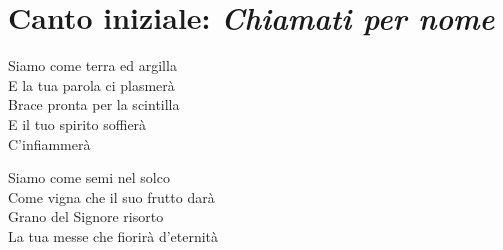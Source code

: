 
\setcounter{page}{1}

\section*{Canto iniziale: \textit{Chiamati per nome}}

	\begin{mystrofe}
	\end{mystrofe}

	\begin{mystrofe}
		Siamo come terra ed argilla \\
		E la tua parola ci plasmerà \\
		Brace pronta per la scintilla \\
		E il tuo spirito soffierà \\
		C'infiammerà
	\end{mystrofe}

	\begin{mystrofe}
		\ritornello{}
	\end{mystrofe}

	\begin{mystrofe}
		Siamo come semi nel solco \\
		Come vigna che il suo frutto darà \\
		Grano del Signore risorto \\
		La tua messe che fiorirà d'eternità
	\end{mystrofe}

	\begin{mystrofe}
		\ritornello{}
	\end{mystrofe}



